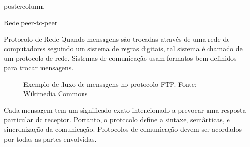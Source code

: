 \documentclass[final]{beamer}
\begin{document}
\begin{frame}
\begin{columns}
\begin{column}{.5\textwidth}
\begin{beamercolorbox}[center,wd=\textwidth]{postercolumn}
\begin{minipage}[T]{.95\textwidth}
{\begin{block}{Rede peer-to-peer}
                \vspace*{0.2cm}
            \end{block}
            
            \vspace*{0.2cm}

            \begin{block}{Protocolo de Rede}
            \justifying
                Quando mensagens são trocadas através de uma rede de computadores seguindo um sistema de regras digitais,
                tal sistema é chamado de um protocolo de rede. Sistemas de comunicação usam formatos bem-definidos para
                trocar mensagens. 
                
                \vspace*{0.4cm} 
                
                \begin{figure}[h]
                  \caption{Exemplo de fluxo de mensagens no protocolo FTP.
                    Fonte: Wikimedia Commons}
                \end{figure}
                
                \vspace*{0.2cm} 
                
                Cada mensagem tem um significado exato intencionado a provocar uma resposta particular
                do receptor. Portanto, o protocolo define a sintaxe, semânticas, e sincronização da comunicação. Protocolos
                de comunicação devem ser acordados por todas as partes envolvidas.
                               
                \vspace*{0.2cm} 
            \end{block}
          }
        \end{minipage}
      \end{beamercolorbox}
    \end{column}


\end{columns}
\end{frame}
\end{document}
